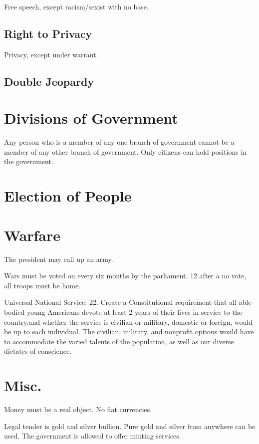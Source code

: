 \documentclass[a4paper]{report}
\begin{document}
Free speech, except racism/sexist with no base.

\subsection{Right to Privacy}

Privacy, except under warrant.

\subsection{Double Jeopardy}

\section{Divisions of Government}

Any person who is a member of any one branch of government cannot be a member of any other branch of government. Only citizens can hold positions in the government.

\section{Election of People}

\section{Warfare}

The president may call up an army.

Wars must be voted on every six months by the parliament. 12 after a no vote, all troops must be home.

Universal National Service:
22. Create a Constitutional requirement that all able-bodied young Americans devote at least 2 years of their lives in service to the country.and whether the service is civilian or military, domestic or foreign, would be up to each individual. The civilian, military, and nonprofit options would have to accommodate the varied talents of the population, as well as our diverse dictates of conscience. 

\section{Misc.}

Money must be a real object. No fiat currencies.

Legal tender is gold and silver bullion.
Pure gold and silver from anywhere can be used.
The government is allowed to offer minting services.
\end{document}
